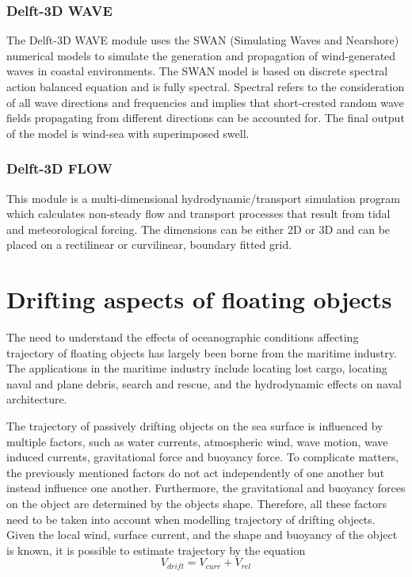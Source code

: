 \documentclass[
]{article}
\begin{document}
\hypertarget{delft-3d-wave}{%
\subsubsection{Delft-3D WAVE}\label{delft-3d-wave}}

The Delft-3D WAVE module uses the SWAN (Simulating Waves and Nearshore)
numerical models to simulate the generation and propagation of
wind-generated waves in coastal environments. The SWAN model is based on
discrete spectral action balanced equation and is fully spectral.
Spectral refers to the consideration of all wave directions and
frequencies and implies that short-crested random wave fields
propagating from different directions can be accounted for. The final
output of the model is wind-sea with superimposed swell.

\hypertarget{delft-3d-flow}{%
\subsubsection{Delft-3D FLOW}\label{delft-3d-flow}}

This module is a multi-dimensional hydrodynamic/transport simulation
program which calculates non-steady flow and transport processes that
result from tidal and meteorological forcing. The dimensions can be
either 2D or 3D and can be placed on a rectilinear or curvilinear,
boundary fitted grid.

\hypertarget{drifting-aspects-of-floating-objects}{%
\section{Drifting aspects of floating
objects}\label{drifting-aspects-of-floating-objects}}

The need to understand the effects of oceanographic conditions affecting
trajectory of floating objects has largely been borne from the maritime
industry. The applications in the maritime industry include locating
lost cargo, locating naval and plane debris, search and rescue, and the
hydrodynamic effects on naval architecture.

The trajectory of passively drifting objects on the sea surface is
influenced by multiple factors, such as water currents, atmospheric
wind, wave motion, wave induced currents, gravitational force and
buoyancy force. To complicate matters, the previously mentioned factors
do not act independently of one another but instead influence one
another. Furthermore, the gravitational and buoyancy forces on the
object are determined by the objects shape. Therefore, all these factors
need to be taken into account when modelling trajectory of drifting
objects. Given the local wind, surface current, and the shape and
buoyancy of the object is known, it is possible to estimate trajectory
by the equation \[V_{drift}=V_{curr} + V_{rel}\]
\end{document}
